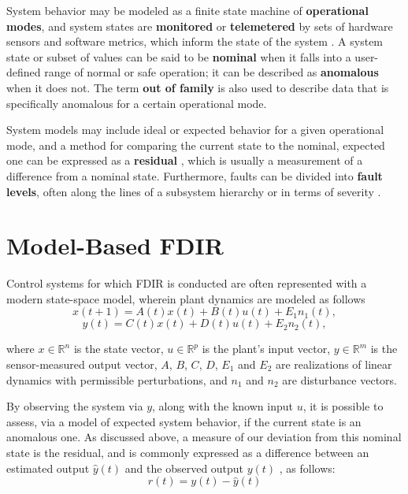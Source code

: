 System behavior may be modeled as a finite state machine of \textbf{operational modes}, and system states are \textbf{monitored} or \textbf{telemetered} by sets of hardware sensors and software metrics, which inform the state of the system \cite{dearden2004real}. A system state or subset of values can be said to be \textbf{nominal} when it falls into a user-defined range of normal or safe operation; it can be described as \textbf{anomalous} when it does not. The term \textbf{out of family} is also used to describe data that is specifically anomalous for a certain operational mode.

System models may include ideal or expected behavior for a given operational mode, and a method for comparing the current state to the nominal, expected one can be expressed as a \textbf{residual} \cite{hwang2010survey}, which is usually a measurement of a difference from a nominal state. Furthermore, faults can be divided into \textbf{fault levels}, often along the lines of a subsystem hierarchy or in terms of severity \cite{tipaldi2014spacecraft}.

\section{Model-Based FDIR}

Control systems for which FDIR is conducted are often represented with a modern state-space model, wherein plant dynamics are modeled as follows \cite{hwang2010survey}
\begin{equation} \label{eq:plant_model1}
    x(t+1) = A(t) x(t) + B(t) u(t) + E_{1}n_{1}(t),
\end{equation}
\begin{equation} \label{eq:plant_model2}
    y(t) = C(t) x(t) + D(t) u(t) + E_{2}n_{2}(t),
\end{equation}

where $x \in \mathbb{R}^{n}$ is the state vector, $u \in \mathbb{R}^{p}$ is the plant's input vector, $y \in \mathbb{R}^{m}$ is the sensor-measured output vector, $A$, $B$, $C$, $D$, $E_{1}$ and $E_{2}$ are realizations of linear dynamics with permissible perturbations, and $n_{1}$ and $n_{2}$ are disturbance vectors.

By observing the system via $y$, along with the known input $u$, it is possible to assess, via a model of expected system behavior, if the current state is an anomalous one. As discussed above, a measure of our deviation from this nominal state is the residual, and is commonly expressed as a difference between an estimated output $\hat{y}(t)$ and the observed output $y(t)$ \cite{hwang2010survey}, as follows:
\begin{equation} \label{eq:residual_generation}
r(t) = y(t) - \hat{y}(t)
\end{equation}

